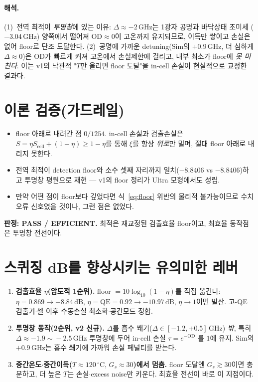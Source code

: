 \documentclass[11pt,a4paper]{article}
\newcommand{\dB}{\,\mathrm{dB}}
\newcommand{\GHz}{\,\mathrm{GHz}}
\newcommand{\degC}{\,^{\circ}\mathrm{C}}
\begin{document}
\paragraph{해석.}
(1)~전역 최적이 \emph{투명창}에 있는 이유: $\Delta\approx-2\GHz$는 1광자 공명과 바닥상태 초미세
($-3.04\GHz$) 양쪽에서 떨어져 $\mathrm{OD}\approx0$이 고온까지 유지되므로, 이득만 쌓이고
손실은 없어 floor로 단조 도달한다. (2)~공명에 가까운 detuning(Sim의 $+0.9\GHz$, 더 심하게
$\Delta\approx0$)은 $\mathrm{OD}$가 빠르게 커져 고온에서 손실제한에 걸리고, 내부 최소가 floor에
\emph{못 미친다}. 이는 v1의 낙관적 "$T$만 올리면 floor 도달"을 in-cell 손실이 현실적으로
교정한 결과다.

\section{이론 검증(가드레일)}
\begin{itemize}[nosep]
\item floor 아래로 내려간 점 $0/1254$. in-cell 손실과 검출손실은 $S=\eta S_{\mathrm{cell}}+(1-\eta)
      \ge 1-\eta$를 통해 $\xi$를 항상 \emph{위로}만 밀며, 절대 floor 아래로 내리지 못한다.
\item 전역 최적이 detection floor와 소수 셋째 자리까지 일치($-8.8406$ vs $-8.8406$)하고 투명창
      평원으로 재현 --- v1의 floor 정리가 Ultra 모형에서도 성립.
\item 만약 어떤 점이 floor보다 깊었다면 식~\eqref{eq:floor} 위반의 물리적 불가능이므로 수치
      오류 신호였을 것이나, 그런 점은 없었다.
\end{itemize}
\textbf{판정: PASS / EFFICIENT.} 최적은 재교정된 검출효율 floor이고, 최효율 동작점은
투명창 전선이다.

\section{스퀴징 dB를 향상시키는 유의미한 레버}
\begin{enumerate}[nosep]
\item \textbf{검출효율 $\eta$(압도적 1순위).} floor $=10\log_{10}(1-\eta)$를 직접 옮긴다:
      $\eta=0.869\to-8.84\dB$, $\eta=\mathrm{QE}=0.92\to-10.97\dB$, $\eta\to1$이면 발산.
      고-QE 검출기$\cdot$셀 이후 수동손실 최소화$\cdot$공간모드 정합.
\item \textbf{투명창 동작(2순위, v2 신규).} $\Delta$를 흡수 쐐기($\Delta\in[-1.2,+0.5]\GHz$)
      \emph{밖}, 특히 $\Delta\approx-1.9\!\sim\!-2.5\GHz$ 투명창에 두어 in-cell 손실 $\tau=e^{-\mathrm{OD}}$
      를 $1$에 유지. Sim의 $+0.9\GHz$는 흡수 쐐기에 가까워 손실 페널티를 받는다.
\item \textbf{중간온도$\cdot$중간이득($T\approx120\degC,\,G_s\approx30$)에서 멈춤.} floor 도달엔
      $G_s\gtrsim30$이면 충분하고, 더 높은 $T$는 손실$\cdot$excess noise만 키운다. 최효율 전선이
      바로 이 지점이다.
\end{enumerate}
\end{document}
